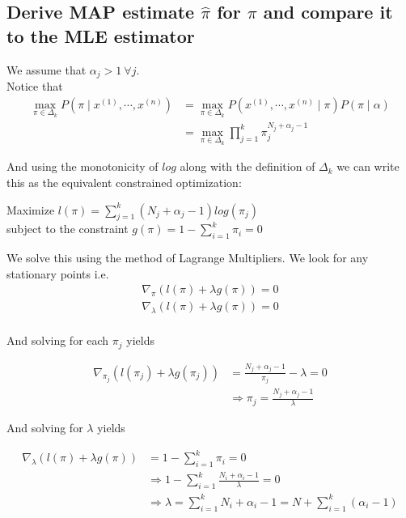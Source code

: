 \documentclass[paper=a4, fontsize=11pt]{scrartcl} %
\numberwithin{equation}{section} %
\numberwithin{figure}{section} %
\numberwithin{table}{section} %
\begin{document}
\subsection{Derive MAP estimate $\hat{\pi}$ for $\pi$ and compare it to the MLE estimator}

We assume that $\alpha_j > 1 \ \forall j$. \\
Notice that 
\begin{align*}
\max\limits_{\pi \in \Delta_k} P(\pi \mid x^{(1)}, \cdots, x^{(n)}) &= \max\limits_{\pi \in \Delta_k} P(x^{(1)}, \cdots, x^{(n)} \mid \pi) P(\pi \mid \alpha) \\
&= \max\limits_{\pi \in \Delta_k}  \prod_{j=1}^{k}\pi_{j}^{N_j + \alpha_j-1}
\end{align*}

And using the monotonicity of $log$ along with the definition of $\Delta_k$ we can write this as the equivalent constrained optimization:

\begin{center}
Maximize $l(\pi) = \sum_{j=1}^k (N_j + \alpha_j -1)log(\pi_j)$\\
subject to the constraint $g(\pi) = 1 - \sum_{i=1}^k \pi_i = 0$
\end{center}

We solve this using the method of Lagrange Multipliers. We look for any stationary points i.e.
\begin{align*}
\nabla_{\pi} ( l(\pi) + \lambda g(\pi) ) = 0 \\
\nabla_{\lambda} ( l(\pi) + \lambda g(\pi) ) = 0 \\
\end{align*}

And solving for each $\pi_j$ yields

\begin{align*}
\nabla_{\pi_j} ( l(\pi_j) + \lambda g(\pi_j) ) &= \frac{N_j + \alpha_j -1}{\pi_j} - \lambda = 0 \\
&\Rightarrow \pi_j = \frac{N_j + \alpha_j -1}{\lambda}
\end{align*}

And solving for $\lambda$ yields

\begin{align*}
\nabla_{\lambda} ( l(\pi) + \lambda g(\pi) ) &= 1 - \sum_{i=1}^k \pi_i = 0 \\
&\Rightarrow 1 - \sum_{i=1}^k \frac{N_i + \alpha_i -1}{\lambda} = 0 \\
&\Rightarrow \lambda = \sum_{i=1}^k N_i + \alpha_i -1 = N + \sum_{i=1}^k (\alpha_i - 1)
\end{align*}
\end{document}
